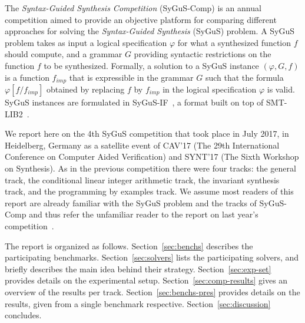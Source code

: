 
The \emph{Syntax-Guided Synthesis Competition} (SyGuS-Comp) is an annual competition aimed to provide an objective platform for comparing different approaches for solving the \emph{Syntax-Guided Synthesis} (SyGuS) problem. A SyGuS problem takes as input a logical specification $\varphi$ for what a synthesized function $f$ should compute, and a grammar $G$ providing syntactic restrictions on the function $f$ to be synthesized. Formally, a solution to a SyGuS instance $(\varphi,G,f)$ is a function $f_{imp}$ that is expressible in the grammar $G$ such that the formula $\varphi[f/f_{imp}]$ obtained by replacing  $f$ by $f_{imp}$ in the logical specification $\varphi$ is valid. SyGuS instances are formulated in SyGuS-IF~\cite{RaghothamanU14}, a format built on top of SMT-LIB2~\cite{smtlib}.

We report here on the 4th SyGuS competition that took place in July 2017, in Heidelberg, Germany as a satellite event of CAV'17 (The 29th International Conference on Computer Aided Verification) and SYNT'17 (The Sixth Workshop on Synthesis). As in the previous competition there were four tracks: the general track, the conditional linear integer arithmetic track, the invariant synthesis track, and the programming by examples track. We assume most readers of this report are already familiar with the SyGuS problem and the tracks of SyGuS-Comp and thus refer the unfamiliar reader to the report on last year's competition~\cite{SyGuSComp15}. 

The report is organized as follows. Section~\ref{sec:benchs} describes the participating benchmarks. Section~\ref{sec:solvers}  lists the participating solvers, and briefly describes the main idea behind their strategy.  Section~\ref{sec:exp-set} provides details on the experimental setup. Section~\ref{sec:comp-results} gives an overview of the results per track. Section~\ref{sec:benchs-pres} provides details on the results, given from a single benchmark respective. Section~\ref{sec:discussion} concludes.